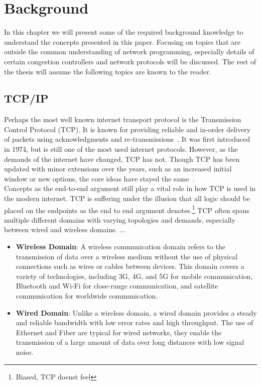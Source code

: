 \documentclass[a4paper,english, 11pt]{report}
\begin{document}
\chapter{Background}

In this chapter we will present some of the required background knowledge to understand the concepts presented in this paper. Focusing on topics that are outside the common understanding of network programming, especially details of certain congestion controllers and network protocols will be discussed. The rest of the thesis will assume the following topics are known to the reader.\\

\section{TCP/IP}
Perhaps the most well known internet transport protocol is the Transmission Control Protocol (TCP). It is known for providing reliable and in-order delivery of packets using acknowledgments and re-transmissions~\cite{Eddy_2022}. It was first introduced in 1974, but is still one of the most used internet protocols. However, as the demands of the internet have changed, TCP has not. Though TCP has been updated with minor extensions over the years, such as an increased initial window or new options, the core ideas have stayed the same~\cite{rfc8803}.\\

Concepts as the end-to-end argument still play a vital role in how TCP is used in the modern internet. TCP is suffering under the illusion that all logic should be placed on the endpoints as the end to end argument denotes.\footnote{Biased, TCP doenst feel} TCP often spans multiple different domains with varying topologies and demands, especially between wired and wireless domains. ...
\begin{itemize}
  \item \textbf{Wireless Domain}: A wireless communication domain refers to the transmission of data over a wireless medium without the use of physical connections such as wires or cables between devices. This domain covers a variety of technologies, including 3G, 4G, and 5G for mobile communication, Bluetooth and Wi-Fi for close-range communication, and satellite communication for worldwide communication.
  \item \textbf{Wired Domain}: Unlike a wireless domain, a wired domain provides a steady and reliable bandwidth with low error rates and high throughput. The use of Ethernet and Fiber are typical for wired networks, they enable the transmission of a large amount of data over long distances with low signal noise. 
\end{itemize}
\end{document}

